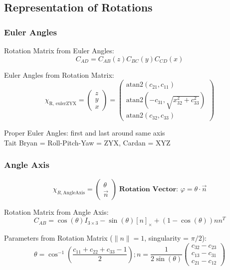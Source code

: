 \documentclass[fontsize=6pt,DIV=calc,a4paper,ngerman]{scrartcl}
\begin{document}
\begin{multicols*}{4}
	\subsection{Representation of Rotations}
	\subsubsection{Euler Angles}

	Rotation Matrix from Euler Angles:
	$$ C_{AD} = C_{AB}(z) C_{BC}(y) C_{CD}(x) $$

	Euler Angles from Rotation Matrix:
	$$\chi_{\text{R, eulerZYX}}
		= \begin{pmatrix} z \\ y \\ x \end{pmatrix}
		= \begin{pmatrix}
			\text{atan2}(c_{21}, c_{11})                      \\
			\text{atan2}(-c_{31}, \sqrt{x_{32}^2 + c_{33}^2}) \\
			\text{atan2}(c_{32}, c_{33})
		\end{pmatrix}
	$$
	
	Proper Euler Angles: first and last around same axis \\
	Tait Bryan = Roll-Pitch-Yaw = ZYX, Cardan = XYZ


	\subsubsection{Angle Axis}
	$$\chi_{R,\text{AngleAxis}}=\begin{pmatrix}\theta \\ \overrightarrow{n}\end{pmatrix} \; \textbf{Rotation Vector: } \varphi = \theta\cdot\overrightarrow{n}$$

	Rotation Matrix from Angle Axis:
	$$ C_{AB} = \cos(\theta) I_{3\times3} - \sin(\theta) [n]_\times  + (1- \cos(\theta)) nn^T $$

	Parameters from Rotation Matrix ($\|n\| = 1$, singularity = $\pi / 2$):
	$$ \theta = \cos^{-1} \left( \frac{c_{11} + c_{22} + c_{33} - 1}{2} \right);
		n = \frac{1}{2\sin(\theta)}
		\begin{pmatrix}
			c_{32} - c_{23} \\
			c_{13} - c_{31} \\
			c_{21} - c_{12}
		\end{pmatrix} $$


\end{multicols*}
\end{document}
